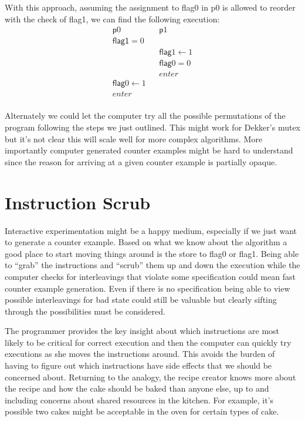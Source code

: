 \documentclass[9pt,twocolumn]{extarticle}
\newcommand{\ttf}[1]{{\ttfamily #1}}
\begin{document}
With this approach, assuming the assignment to \ttf{flag0} in \ttf{p0} is allowed to reorder with the check of \ttf{flag1}, we can find the following execution:
\begin{align*}
    & \mathsf{p}0                 &  & \mathsf{p}1            & \\
    & \mathsf{\mathsf{flag}1} = 0 &  &                        & \\
    &                             &  & \mathsf{flag}1 \gets 1 & \\
 &                             &  & \mathsf{flag}0 = 0     & \\
 &                             &  & enter                  & \\
 & \mathsf{flag}0 \gets 1      &  &                        & \\
 & enter                       &  &                        & \\
\end{align*}
\vspace{-0.75cm}

Alternately we could let the computer try all the possible permutations of the program following the steps we just outlined. This might work for Dekker's mutex but it's not clear this will scale well for more complex algorithms. More importantly computer generated counter examples might be hard to understand since the reason for arriving at a given counter example is partially opaque.

\vspace{-0.25cm}
\section{Instruction Scrub}
\vspace{-0.25cm}
Interactive experimentation might be a happy medium, especially if we just want to generate a counter example. Based on what we know about the algorithm a good place to start moving things around is the store to \ttf{flag0} or \ttf{flag1}. Being able to ``grab'' the instructions and ``scrub'' them up and down the execution while the computer checks for interleavings that violate some specification could mean fast counter example generation. Even if there is no specification being able to view possible interleavings for bad state could still be valuable but clearly sifting through the possibilities must be considered.

The programmer provides the key insight about which instructions are most likely to be critical for correct execution and then the computer can quickly try executions as she moves the instructions around. This avoids the burden of having to figure out which instructions have side effects that we should be concerned about. Returning to the analogy, the recipe creator knows more about the recipe and how the cake should be baked than anyone else, up to and including concerns about shared resources in the kitchen. For example, it's possible two cakes might be acceptable in the oven for certain types of cake.
\end{document}
